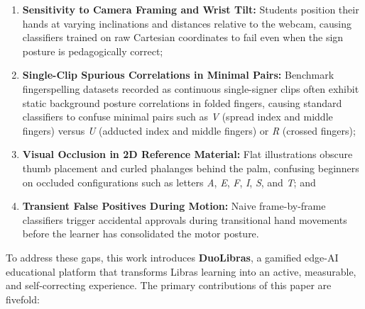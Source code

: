 \documentclass[12pt,a4paper]{article}
\begin{document}
\begin{enumerate}
    \item \textbf{Sensitivity to Camera Framing and Wrist Tilt:} Students position their hands at varying inclinations and distances relative to the webcam, causing classifiers trained on raw Cartesian coordinates to fail even when the sign posture is pedagogically correct;

    \item \textbf{Single-Clip Spurious Correlations in Minimal Pairs:} Benchmark fingerspelling datasets recorded as continuous single-signer clips often exhibit static background posture correlations in folded fingers, causing standard classifiers to confuse minimal pairs such as \textit{V} (spread index and middle fingers) versus \textit{U} (adducted index and middle fingers) or \textit{R} (crossed fingers);

    \item \textbf{Visual Occlusion in 2D Reference Material:} Flat illustrations obscure thumb placement and curled phalanges behind the palm, confusing beginners on occluded configurations such as letters \textit{A}, \textit{E}, \textit{F}, \textit{I}, \textit{S}, and \textit{T}; and

    \item \textbf{Transient False Positives During Motion:} Naive frame-by-frame classifiers trigger accidental approvals during transitional hand movements before the learner has consolidated the motor posture.
\end{enumerate}

To address these gaps, this work introduces \textbf{DuoLibras}, a gamified edge-AI educational platform that transforms Libras learning into an active, measurable, and self-correcting experience. The primary contributions of this paper are fivefold:
\end{document}
